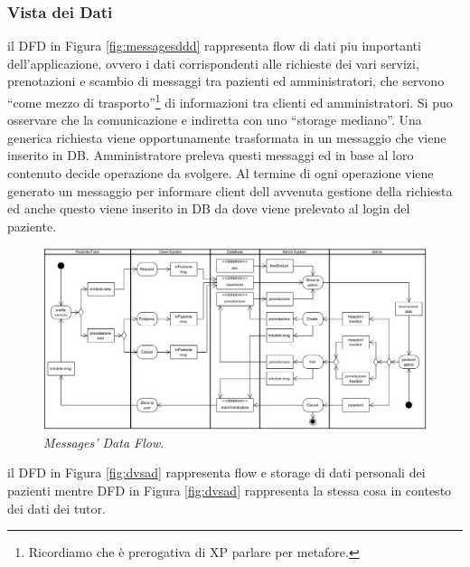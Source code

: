\subsubsection{Vista dei Dati}
il DFD in Figura \vref{fig:messagesddd} rappresenta flow di dati piu importanti dell'applicazione, ovvero i dati corrispondenti alle richieste dei vari servizi, prenotazioni e scambio di messaggi tra pazienti ed amministratori, che servono ``come mezzo di trasporto''\footnote{Ricordiamo che è prerogativa di XP parlare per metafore.} di informazioni tra clienti ed amministratori. Si puo osservare che la comunicazione e indiretta con uno ``storage mediano''. Una generica richiesta viene opportunamente trasformata in un messaggio che viene inserito in DB. Amministratore preleva questi messaggi ed in base al loro contenuto decide operazione da svolgere. Al termine di ogni operazione viene generato un messaggio per informare client dell avvenuta gestione della richiesta ed anche questo viene inserito in DB da dove viene prelevato al login del paziente.

\begin{figure}[!thp]
\centering
\includegraphics[scale=0.5]{svgs2/ddd/request-prenotation-overall}
\caption{\textit{Messages' Data Flow}.}
\label{fig:messagesddd}
\end{figure}

il DFD in Figura \vref{fig:dvsad} rappresenta flow e storage di dati personali dei pazienti mentre DFD in Figura \vref{fig:dvsad} rappresenta la stessa cosa in contesto dei dati dei tutor.

